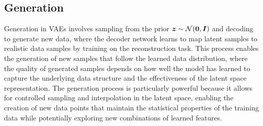 \subsection{Generation}

Generation in VAEs involves sampling from the prior $\boldsymbol{z} \sim \mathcal{N}(\boldsymbol{0}, \boldsymbol{I})$ and decoding to generate new data, where the decoder network learns to map latent samples to realistic data samples by training on the reconstruction task. This process enables the generation of new samples that follow the learned data distribution, where the quality of generated samples depends on how well the model has learned to capture the underlying data structure and the effectiveness of the latent space representation. The generation process is particularly powerful because it allows for controlled sampling and interpolation in the latent space, enabling the creation of new data points that maintain the statistical properties of the training data while potentially exploring new combinations of learned features.



